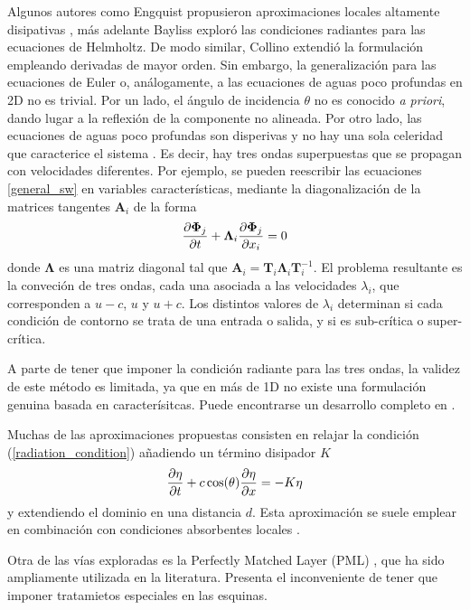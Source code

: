 Algunos autores como Engquist propusieron aproximaciones locales altamente disipativas \cite{engquist1977}, más adelante Bayliss \cite{bayliss1982} exploró las condiciones radiantes para las ecuaciones de Helmholtz. De modo similar, Collino \cite{collino1993} extendió la formulación empleando derivadas de mayor orden. Sin embargo, la generalización para las ecuaciones de Euler o, análogamente, a las ecuaciones de aguas poco profundas en 2D no es trivial. Por un lado, el ángulo de incidencia $\theta$ no es conocido \emph{a priori}, dando lugar a la reflexión de la componente no alineada. Por otro lado, las ecuaciones de aguas poco profundas son disperivas y no hay una sola celeridad que caracterice el sistema \cite{wei1995}. Es decir, hay tres ondas superpuestas que se propagan con velocidades diferentes. Por ejemplo, se pueden reescribir las ecuaciones \ref{general_sw} en variables características, mediante la diagonalización de la matrices tangentes $\mathbf{A}_i$ de la forma
\begin{equation}
    \frac{\partial\bm\Phi_j}{\partial t} + \bm\Lambda_i \frac{\partial\bm\Phi_j}{\partial x_i} = 0
\end{equation}
donde $\bm\Lambda$ es una matriz diagonal tal que $\bm A_i = \bm T_i \bm\Lambda_i \bm T_i^{-1}$. El problema resultante es la conveción de tres ondas, cada una asociada a las velocidades $\lambda_i$, que corresponden a $u-c$, $u$ y $u+c$. Los distintos valores de $\lambda_i$ determinan si cada condición de contorno se trata de una entrada o salida, y si es sub-crítica o super-crítica.

A parte de tener que imponer la condición radiante para las tres ondas, la validez de este método es limitada, ya que en más de 1D no existe una formulación genuina basada en caracterísitcas. Puede encontrarse un desarrollo completo en \cite{lie2001}.

Muchas de las aproximaciones propuestas \cite{israeli1981,navon2004,carmigniani2018} consisten en relajar la condición (\ref{radiation_condition}) añadiendo un término disipador $K$
\begin{equation} \label{radiation_absorbing_condition}
    \frac{\partial\eta}{\partial t} + c \cos(\theta)\frac{\partial\eta}{\partial x} = -K\eta
\end{equation}
y extendiendo el dominio en una distancia $d$. Esta aproximación se suele emplear en combinación con condiciones absorbentes locales \cite{wei1995}.

Otra de las vías exploradas es la Perfectly Matched Layer (PML) \cite{berenger1994}, que ha sido ampliamente utilizada en la literatura. Presenta el inconveniente de tener que imponer tratamietos especiales en las esquinas.


